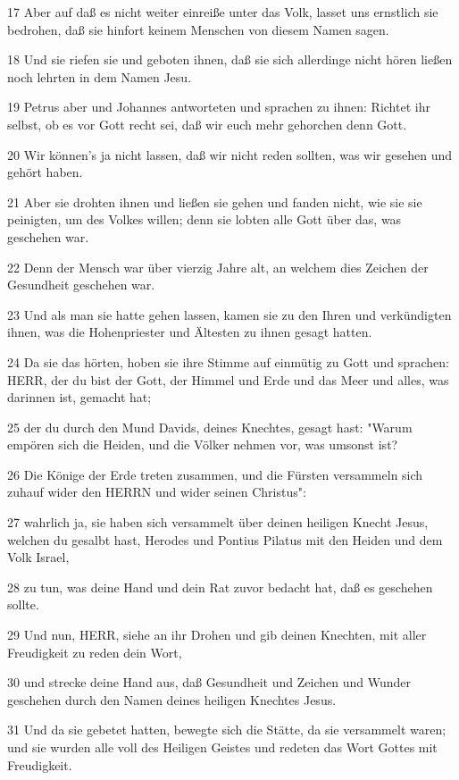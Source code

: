 \par 17 Aber auf daß es nicht weiter einreiße unter das Volk, lasset uns ernstlich sie bedrohen, daß sie hinfort keinem Menschen von diesem Namen sagen.
\par 18 Und sie riefen sie und geboten ihnen, daß sie sich allerdinge nicht hören ließen noch lehrten in dem Namen Jesu.
\par 19 Petrus aber und Johannes antworteten und sprachen zu ihnen: Richtet ihr selbst, ob es vor Gott recht sei, daß wir euch mehr gehorchen denn Gott.
\par 20 Wir können's ja nicht lassen, daß wir nicht reden sollten, was wir gesehen und gehört haben.
\par 21 Aber sie drohten ihnen und ließen sie gehen und fanden nicht, wie sie sie peinigten, um des Volkes willen; denn sie lobten alle Gott über das, was geschehen war.
\par 22 Denn der Mensch war über vierzig Jahre alt, an welchem dies Zeichen der Gesundheit geschehen war.
\par 23 Und als man sie hatte gehen lassen, kamen sie zu den Ihren und verkündigten ihnen, was die Hohenpriester und Ältesten zu ihnen gesagt hatten.
\par 24 Da sie das hörten, hoben sie ihre Stimme auf einmütig zu Gott und sprachen: HERR, der du bist der Gott, der Himmel und Erde und das Meer und alles, was darinnen ist, gemacht hat;
\par 25 der du durch den Mund Davids, deines Knechtes, gesagt hast: "Warum empören sich die Heiden, und die Völker nehmen vor, was umsonst ist?
\par 26 Die Könige der Erde treten zusammen, und die Fürsten versammeln sich zuhauf wider den HERRN und wider seinen Christus":
\par 27 wahrlich ja, sie haben sich versammelt über deinen heiligen Knecht Jesus, welchen du gesalbt hast, Herodes und Pontius Pilatus mit den Heiden und dem Volk Israel,
\par 28 zu tun, was deine Hand und dein Rat zuvor bedacht hat, daß es geschehen sollte.
\par 29 Und nun, HERR, siehe an ihr Drohen und gib deinen Knechten, mit aller Freudigkeit zu reden dein Wort,
\par 30 und strecke deine Hand aus, daß Gesundheit und Zeichen und Wunder geschehen durch den Namen deines heiligen Knechtes Jesus.
\par 31 Und da sie gebetet hatten, bewegte sich die Stätte, da sie versammelt waren; und sie wurden alle voll des Heiligen Geistes und redeten das Wort Gottes mit Freudigkeit.
